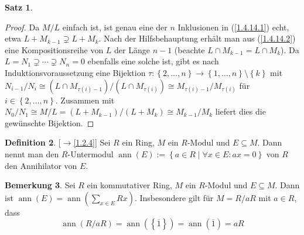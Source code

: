 \documentclass[
twoside=semi,
fontsize=12,
DIV=12, 
cleardoublepage=current,
leqno,
headings=optiontoheadandtoc, 
toc=idx
]{scrbook}
\newcommand{\brac}[1]{\left( #1 \right)}
\newcommand{\set}[1]{\left\{ #1 \right\}}
\DeclareMathOperator{\ann}{ann}
\theoremstyle{definition}
\newtheorem{definition}{Definition}[section]
\newtheorem{bemerkung}[definition]{Bemerkung}
\newtheorem{satz}[definition]{Satz}
\begin{document}
\begin{satz}
\begin{proof}
			
			\medskip\noindent
			Da $M/L$ einfach ist, ist genau eine der $n$ Inklusionen in (\ref{1.4.14.1}) echt, etwa $L+M_{k-1} \supsetneq L + M_k$. Nach der Hilfsbehauptung erh\"alt man aus (\ref{1.4.14.2}) eine Kompositionsreihe von $L$ der L\"ange $n-1$ (beachte $L\cap M_{k-1} = L\cap M_k$). Da $L=N_1\supsetneq \cdots \supsetneq N_n = 0$ ebenfalls eine solche ist, gibt es nach Induktionsvoraussetzung eine Bijektion $\tau: \set{2, \dots, n} \to \set{1, \dots, n} \setminus \set{k}$ mit $N_{i-1}/N_i \cong (L\cap M_{\tau(i)-1})/(L\cap M_{\tau(i)}) \cong M_{\tau(i)-1} / M_{\tau(i)}$ f\"ur $i \in \set{2,\dots, n}$. Zusammen mit $N_0/N_1 \cong M/L = (L+M_{k-1})/(L+M_k) \cong M_{k-1}/M_k$ liefert dies die gew\"unschte Bijektion.
		\end{proof}
	\end{satz}

	\begin{definition}\label{1.4.15}
		[$\rightarrow$\ref{1.2.4}]\newline
		Sei $R$ ein Ring, $M$ ein $R$-Modul und $E\subseteq M$. Dann nennt man den $R$-Untermodul \linebreak $\ann(E) := \set{a \in R \mid \forall x \in E: ax = 0}$ von $R$ den Annihilator von $E$.
	\end{definition}

	\begin{bemerkung}\label{1.4.16}\hfill\newline
		Sei $R$ ein kommutativer Ring, $M$ ein $R$-Modul und $E\subseteq M$. Dann ist \linebreak $\ann(E)=\ann\brac{\sum_{x\in E} Rx}$. Insbesondere gilt f\"ur $M=R/aR$ mit $a \in R$, dass
			\[\ann(R/aR) = \ann(\set{\overline{1}}) = \ann(\overline{1}) = aR\]
	\end{bemerkung}
\end{document}
